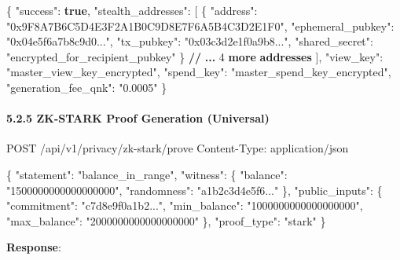 \documentclass[
  11pt,
]{article}
\newenvironment{Shaded}{\begin{snugshade}}{\end{snugshade}}
\newcommand{\DataTypeTok}[1]{\textcolor[rgb]{0.13,0.29,0.53}{#1}}
\newcommand{\DecValTok}[1]{\textcolor[rgb]{0.00,0.00,0.81}{#1}}
\newcommand{\ErrorTok}[1]{\textcolor[rgb]{0.64,0.00,0.00}{\textbf{#1}}}
\newcommand{\FunctionTok}[1]{\textcolor[rgb]{0.00,0.00,0.00}{#1}}
\newcommand{\KeywordTok}[1]{\textcolor[rgb]{0.13,0.29,0.53}{\textbf{#1}}}
\newcommand{\NormalTok}[1]{#1}
\newcommand{\OtherTok}[1]{\textcolor[rgb]{0.56,0.35,0.01}{#1}}
\newcommand{\StringTok}[1]{\textcolor[rgb]{0.31,0.60,0.02}{#1}}
\begin{document}
\begin{Shaded}
\begin{Highlighting}[]
\FunctionTok{\{}
  \DataTypeTok{"success"}\FunctionTok{:} \KeywordTok{true}\FunctionTok{,}
  \DataTypeTok{"stealth\_addresses"}\FunctionTok{:} \OtherTok{[}
    \FunctionTok{\{}
      \DataTypeTok{"address"}\FunctionTok{:} \StringTok{"0x9F8A7B6C5D4E3F2A1B0C9D8E7F6A5B4C3D2E1F0"}\FunctionTok{,}
      \DataTypeTok{"ephemeral\_pubkey"}\FunctionTok{:} \StringTok{"0x04e5f6a7b8c9d0..."}\FunctionTok{,}
      \DataTypeTok{"tx\_pubkey"}\FunctionTok{:} \StringTok{"0x03c3d2e1f0a9b8..."}\FunctionTok{,}
      \DataTypeTok{"shared\_secret"}\FunctionTok{:} \StringTok{"encrypted\_for\_recipient\_pubkey"}
    \FunctionTok{\}}
    \ErrorTok{//} \ErrorTok{...} \DecValTok{4} \ErrorTok{more} \ErrorTok{addresses}
  \OtherTok{]}\FunctionTok{,}
  \DataTypeTok{"view\_key"}\FunctionTok{:} \StringTok{"master\_view\_key\_encrypted"}\FunctionTok{,}
  \DataTypeTok{"spend\_key"}\FunctionTok{:} \StringTok{"master\_spend\_key\_encrypted"}\FunctionTok{,}
  \DataTypeTok{"generation\_fee\_qnk"}\FunctionTok{:} \StringTok{"0.0005"}
\FunctionTok{\}}
\end{Highlighting}
\end{Shaded}

\hypertarget{zk-stark-proof-generation-universal}{%
\paragraph{5.2.5 ZK-STARK Proof Generation
(Universal)}\label{zk-stark-proof-generation-universal}}

\begin{Shaded}
\begin{Highlighting}[]
\NormalTok{POST /api/v1/privacy/zk{-}stark/prove}
\NormalTok{Content{-}Type: application/json}

\NormalTok{\{}
\NormalTok{  "statement": "balance\_in\_range",}
\NormalTok{  "witness": \{}
\NormalTok{    "balance": "1500000000000000000",}
\NormalTok{    "randomness": "a1b2c3d4e5f6..."}
\NormalTok{  \},}
\NormalTok{  "public\_inputs": \{}
\NormalTok{    "commitment": "c7d8e9f0a1b2...",}
\NormalTok{    "min\_balance": "1000000000000000000",}
\NormalTok{    "max\_balance": "2000000000000000000"}
\NormalTok{  \},}
\NormalTok{  "proof\_type": "stark"}
\NormalTok{\}}
\end{Highlighting}
\end{Shaded}

\textbf{Response}:
\end{document}
